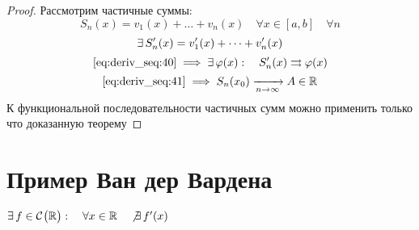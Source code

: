 \begin{proof}
	Рассмотрим частичные суммы:
	$$ S_n(x) = v_1(x) + \dots + v_n(x) \quad \forall x \in [a, b] \quad \forall n $$
	$$ \exists\, S_n'(x) = v_1'(x) + \dots + v_n'(x) $$
	$$ \eref{deriv_seq:40} \implies \exist \vphi(x) : \quad S_n'(x) \rightrightarrows \vphi(x) $$
	$$ \eref{deriv_seq:41} \implies S_n(x_0) \infarr{n} A \in \R $$
	К функциональной последовательности частичных сумм можно применить только что доказанную теорему
\end{proof}

\section{Пример Ван дер Вардена}

\begin{theorem}
	$ \exists\, f \in \mathcal{C}^{} \big( {\mathbb{R}} \big)  : \quad \forall x \in \mathbb{R} \quad \not\exists\, f'(x) $
\end{theorem}

